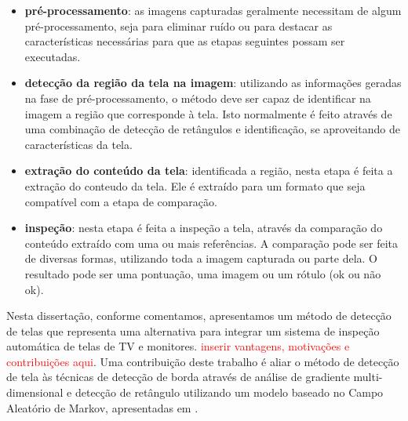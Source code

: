 \begin{itemize}
\item \textbf{pré-processamento}: as imagens capturadas geralmente necessitam de algum pré-processamento, seja para eliminar ruído ou para destacar as características necessárias para que as etapas seguintes possam ser executadas.
\item \textbf{detecção da região da tela na imagem}: utilizando as informações geradas na fase de pré-processamento, o método deve ser capaz de identificar na imagem a região que corresponde  à tela. Isto normalmente é feito através de uma combinação de detecção de retângulos e identificação, se aproveitando de características da tela.
\item \textbf{extração do conteúdo da tela}: identificada a região, nesta etapa é feita a extração do conteudo da tela. Ele é extraído para um formato que seja compatível com a etapa de comparação.
\item \textbf{inspeção}: nesta etapa é feita a inspeção a tela, através da comparação do conteúdo extraído com uma ou mais referências. A comparação pode ser feita de diversas formas, utilizando toda a imagem capturada ou parte dela. O resultado pode ser uma pontuação, uma imagem ou um rótulo (ok ou não ok).
\end{itemize}

Nesta dissertação, conforme comentamos, apresentamos um método de detecção de telas que representa uma alternativa para integrar um sistema de inspeção automática de telas de TV e monitores. \textcolor{red}{inserir vantagens, motivações e contribuições aqui}. Uma contribuição deste trabalho é aliar o método de detecção de tela às técnicas de detecção de borda através de análise de gradiente multi-dimensional e detecção de retângulo utilizando um modelo baseado no Campo Aleatório de Markov, apresentadas em \cite{mrf}.



